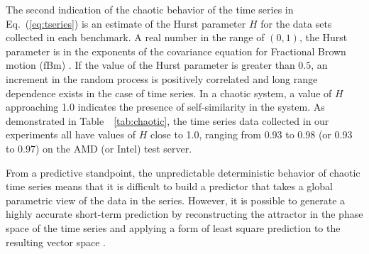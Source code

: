 \documentclass[prodmode,acmtaco,pdftex]{acmsmall}
\newcommand{\equationname}{Eq.}
\begin{document}
The second indication of the chaotic behavior of the time series in
\equationname~(\ref{eq:tseries}) is an estimate of the Hurst parameter
$H$ for the data sets collected in each benchmark.  A real number in the
range of $(0, 1)$, the Hurst parameter is in the exponents of the
covariance equation for Fractional Brown motion (fBm) \cite{Sprott2003}.
If the value of the Hurst parameter is greater than $0.5$, an increment
in the random process is positively correlated and long range dependence
exists in the case of time series.  In a chaotic system, a value of $H$
approaching 1.0 indicates the presence of self-similarity in the system.
As demonstrated in Table~~\ref{tab:chaotic}, the time series data
collected in our experiments all have values of $H$ close to 1.0,
ranging from 0.93 to 0.98 (or 0.93 to 0.97) on the AMD (or Intel) test
server.
  \begin{table}%
\end{table}

From a predictive standpoint, the unpredictable deterministic behavior
of chaotic time series means that it is difficult to build a predictor
that takes a global parametric view of the data in the series.  However,
it is possible to generate a highly accurate short-term prediction by
reconstructing the attractor in the phase space of the time series and
applying a form of least square prediction to the resulting vector space
\cite{Itoh1995,Su2010}.
\end{document}
